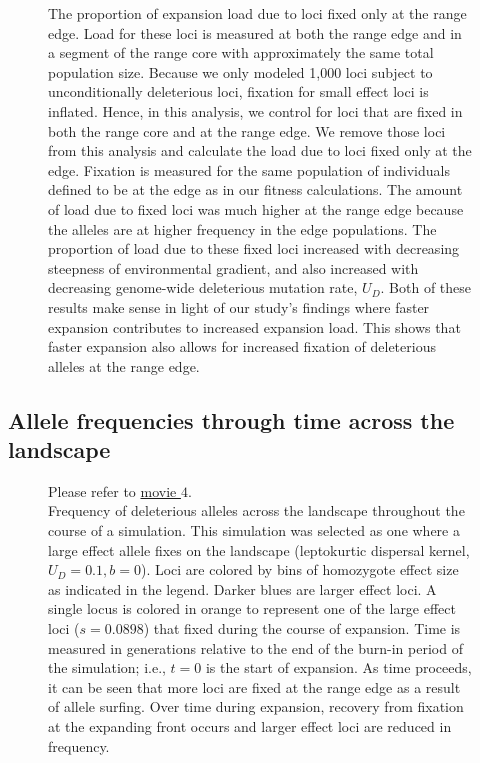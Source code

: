 \begin{figure}[h!]
\centering
{}
\caption[ ~ - Load due to loci fixed at the range edge.]{The proportion of expansion load due to loci fixed only at the range edge. Load for these loci is measured at both the range edge and in a segment of the range core with approximately the same total population size. Because we only modeled 1,000 loci subject to unconditionally deleterious loci, fixation for small effect loci is inflated. Hence, in this analysis, we control for loci that are fixed in both the range core and at the range edge. We remove those loci from this analysis and calculate the load due to loci fixed only at the edge. Fixation is measured for the same population of individuals defined to be at the edge as in our fitness calculations. The amount of load due to fixed loci was much higher at the range edge because the alleles are at higher frequency in the edge populations. The proportion of load due to these fixed loci increased with decreasing steepness of environmental gradient, and also increased with decreasing genome-wide deleterious mutation rate, $U_D$. Both of these results make sense in light of our study's findings where faster expansion contributes to increased expansion load. This shows that faster expansion also allows for increased fixation of deleterious alleles at the range edge.}
\label{fig:fixedload}
\end{figure}


\newpage{}


\subsection{Allele frequencies through time across the landscape}

\begin{figure}[h!]
\caption[ ~ - Frequency of deleterious alleles across the landscape throughout the course of a simulation.]{Please refer to \href{http://www.zoology.ubc.ca/~kgilbert/AlleleFrequencies.mp4}{movie $4$}. \\ Frequency of deleterious alleles across the landscape throughout the course of a simulation. This simulation was selected as one where a large effect allele fixes on the landscape (leptokurtic dispersal kernel, $U_D = 0.1, b = 0$). Loci are colored by bins of homozygote effect size as indicated in the legend. Darker blues are larger effect loci. A single locus is colored in orange to represent one of the large effect loci ($s = 0.0898$) that fixed during the course of expansion. Time is measured in generations relative to the end of the burn-in period of the simulation; i.e., $t = 0$ is the start of expansion. As time proceeds, it can be seen that more loci are fixed at the range edge as a result of allele surfing. Over time during expansion, recovery from fixation at the expanding front occurs and larger effect loci are reduced in frequency.}
\label{fig:allfreqmov}
\end{figure}
